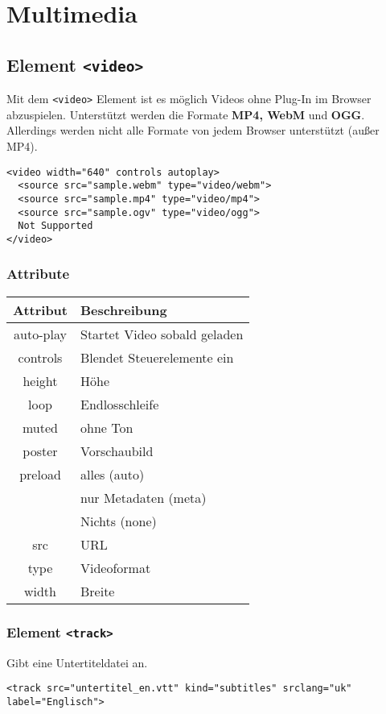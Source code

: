 \chapter{Multimedia} 
\section{Element \texttt{<video>}} 
Mit dem \texttt{<video>} Element ist es möglich Videos ohne Plug-In im Browser abzuspielen. Unterstützt werden die Formate \textbf{MP4, WebM} und \textbf{OGG}. Allerdings werden nicht alle Formate von jedem Browser unterstützt (außer MP4). 
\begin{lstlisting}[caption=''Video'']
<video width="640" controls autoplay>
  <source src="sample.webm" type="video/webm">
  <source src="sample.mp4" type="video/mp4">
  <source src="sample.ogv" type="video/ogg">
  Not Supported
</video>
\end{lstlisting}
\subsection{Attribute}
\begin{tabular}{|c|l|}
\hline
\rowcolor{lstback}\textbf{Attribut}	&\textbf{Beschreibung}\\
\hline
auto-play		&Startet Video sobald geladen\\
\hline
controls		&Blendet Steuerelemente ein\\
\hline
height		&Höhe\\
\hline
loop			&Endlosschleife\\
\hline
muted		&ohne Ton\\
\hline
poster		&Vorschaubild\\
\hline
preload		&alles (auto)\\
			&nur Metadaten (meta)\\
			&Nichts (none)\\
\hline
src			&URL\\
\hline
type			&Videoformat\\
\hline
width			&Breite\\
\hline
\end{tabular}
\subsection{Element \texttt{<track>}}
Gibt eine Untertiteldatei an.\\[-1.5em]
 \begin{verbatim}
<track src="untertitel_en.vtt" kind="subtitles" srclang="uk" label="Englisch">
\end{verbatim}
\newpage
